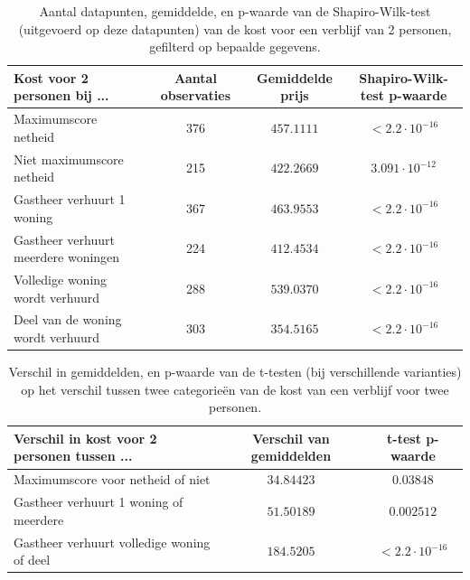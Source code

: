\documentclass[a4paper]{kulakarticle}
\begin{document}
	\begin{table}
		\caption{Aantal datapunten, gemiddelde, en p-waarde van de Shapiro-Wilk-test (uitgevoerd op deze datapunten) van de kost voor een verblijf van 2 personen, gefilterd op bepaalde gegevens.}
		\label{tab:intermediary_results_gemiddelde_kost}
		\begin{tabular}{|l*{3}{|c}|}
			\hline
			Kost voor 2 personen bij ...        & Aantal observaties & Gemiddelde prijs & Shapiro-Wilk-test p-waarde \\ \hline
			\hline
			Maximumscore netheid                & 376    & $457.1111$ & $< 2.2 \cdot 10^{-16}$ \\ \hline
			Niet maximumscore netheid           & 215    & $422.2669$ & $3.091 \cdot 10^{-12}$ \\ \hline
			Gastheer verhuurt 1 woning          & 367    & $463.9553$ & $< 2.2 \cdot 10^{-16}$ \\ \hline
			Gastheer verhuurt meerdere woningen & 224    & $412.4534$ & $< 2.2 \cdot 10^{-16}$ \\ \hline
			Volledige woning wordt verhuurd     & 288    & $539.0370$ & $< 2.2 \cdot 10^{-16}$ \\ \hline
			Deel van de woning wordt verhuurd   & 303    & $354.5165$ & $< 2.2 \cdot 10^{-16}$ \\ \hline
		\end{tabular}
	\end{table}

	\begin{table}
		\caption{Verschil in gemiddelden, en p-waarde van de t-testen (bij verschillende varianties) op het verschil tussen twee categorieën van de kost van een verblijf voor twee personen.}
		\label{tab:end_results_gemiddelde_kost}
		\begin{tabular}{|l*{2}{|c}|}
			\hline
			Verschil in kost voor 2 personen tussen ...  & Verschil van gemiddelden
			& t-test p-waarde \\ \hline
			\hline
			
			Maximumscore voor netheid of niet                 & $34.84423$
			& $0.03848$              \\ \hline
			Gastheer verhuurt 1 woning of meerdere       & $51.50189$
			& $0.002512$             \\ \hline
			Gastheer verhuurt volledige woning of deel   & $184.5205$
			& $< 2.2 \cdot 10^{-16}$ \\ \hline
		\end{tabular}
	\end{table}
	
\end{document}

